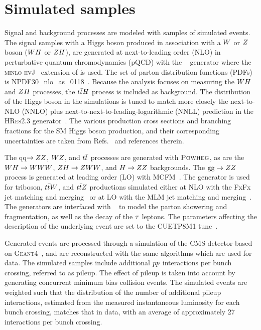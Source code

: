 \section{Simulated samples}

Signal and background processes are modeled with samples of simulated events.
The signal samples with a Higgs boson produced in association with a $W$ or 
$Z$ boson ($WH$ or $ZH$), are generated at next-to-leading order 
(NLO) in perturbative quantum chromodynamics (pQCD) with the ~\cite{Nason:2004rx,Frixione:2007vw, Alioli:2010xd, Alioli:2010xa, Alioli:2008tz} 
generator where the \textsc{minlo hvJ}~\cite{Luisoni:2013kna} extension of 
 is used. The set of parton distribution functions (PDFs) is 
NPDF30\_nlo\_as\_0118~\cite{Ball:2011uy}. Because the analysis focuses on
measuring the $WH$ and $ZH$ processes, the $t\bar{t}H$ process is 
included as background. The \pt distribution of 
the Higgs boson in the {} simulations is tuned to match more closely
the next-to-NLO (NNLO) plus next-to-next-to-leading-logarithmic (NNLL) prediction in the
\textsc{HRes2.3} generator~\cite{deFlorian:2012mx,Grazzini:2013mca}. 
The various production cross sections and branching fractions for the SM Higgs 
boson production, and their corresponding uncertainties are taken from 
Refs.~\cite{deFlorian:2016spz,Denner:2011mq,Ball:2011mu} and references therein.

The qq$\to ZZ$, $WZ$, and $t\bar{t}$ processes are generated with 
$\textsc{Powheg}$, as are the $WH \to WWW$, $ZH \to ZWW$, and $H \to ZZ$ backgrounds. 
The $\text{g}\text{g} \to ZZ$ process is generated at leading order (LO) with 
\textsc{MCFM}~\cite{Campbell:2010ff}. The \MGAMCNLO generator is used for 
triboson, $t\bar{t} W$, and $t\bar{t} Z$  productions simulated either at 
NLO with the FxFx jet matching and merging~\cite{Frederix:2012ps} 
or at LO with the MLM jet matching and merging~\cite{Alwall:2007fs}.  
The generators are interfaced with  ~\cite{Sjostrand:2014zea} 
to model the parton showering and fragmentation, as well as the decay of the $\tau$ leptons.
The \PYTHIA parameters affecting the description of the underlying event are 
set to the {CUETP8M1} tune~\cite{Khachatryan:2015pea}.

Generated events are processed through a simulation of the CMS detector based on
\textsc{Geant4}~\cite{Agostinelli:2002hh}, and are reconstructed with the same algorithms 
which are used for data.
The simulated samples include additional $pp$ interactions per bunch
crossing, referred to as pileup.
The effect of pileup is taken into account by generating concurrent minimum 
bias collision events. The simulated events are weighted 
such that the distribution of the number of additional pileup interactions, 
estimated from the measured instantaneous luminosity for each bunch crossing, 
matches that in data, with an average of approximately 27 interactions per bunch crossing.



